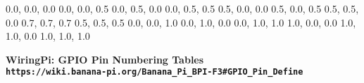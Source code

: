 \documentclass[11pt,a4paper]{article}
\begin{document}
\begin{sffamily}
\definecolor{rtb-black}{rgb}  {0.0, 0.0, 0.0}
\definecolor{rtb-navy}{rgb}   {0.0, 0.0, 0.5}
\definecolor{rtb-green}{rgb}  {0.0, 0.5, 0.0}
\definecolor{rtb-teal}{rgb}   {0.0, 0.5, 0.5}
\definecolor{rtb-maroon}{rgb} {0.5, 0.0, 0.0}
\definecolor{rtb-purple}{rgb} {0.5, 0.0, 0.5}
\definecolor{rtb-olive}{rgb}  {0.5, 0.5, 0.0}
\definecolor{rtb-silver}{rgb} {0.7, 0.7, 0.7}
\definecolor{rtb-grey}{rgb}   {0.5, 0.5, 0.5}
\definecolor{rtb-blue}{rgb}   {0.0, 0.0, 1.0}
\definecolor{rtb-lime}{rgb}   {0.0, 1.0, 0.0}
\definecolor{rtb-aqua}{rgb}   {0.0, 1.0, 1.0}
\definecolor{rtb-red}{rgb}    {1.0, 0.0, 0.0}
\definecolor{rtb-yellow}{rgb} {1.0, 1.0, 0.0}
\definecolor{rtb-white}{rgb}  {1.0, 1.0, 1.0}

\begin{center}
\bfseries{WiringPi: GPIO Pin Numbering Tables}\\
\tt{https://wiki.banana-pi.org/Banana_Pi_BPI-F3#GPIO_Pin_Define}
\end{center}


\end{sffamily}
\end{document}
